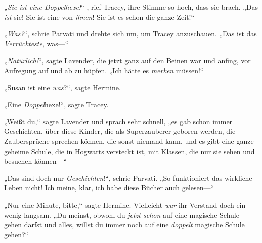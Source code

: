 „\emph{Sie ist eine Doppelhexe!}“ , rief Tracey, ihre Stimme so hoch, dass sie brach. „Das \emph{ist} sie! Sie ist eine von \emph{ihnen}! Sie ist es schon die ganze Zeit!“

„\emph{Was?}“, schrie Parvati und drehte sich um, um Tracey anzuschauen. „Das ist das \emph{Verrückteste}, was—“

„\emph{Natürlich!}“, sagte Lavender, die jetzt ganz auf den Beinen war und anfing, vor Aufregung auf und ab zu hüpfen. „Ich hätte es \emph{merken} müssen!“

„Susan ist eine \emph{was}?“, sagte Hermine.

„Eine \emph{Doppel}hexe!“, sagte Tracey.

„Weißt du,“ sagte Lavender und sprach sehr schnell, „es gab schon immer Geschichten, über diese Kinder, die als Superzauberer geboren werden, die Zaubersprüche sprechen können, die sonst niemand kann, und es gibt eine ganze geheime Schule, die in Hogwarts versteckt ist, mit Klassen, die nur sie sehen und besuchen können—“

„Das sind doch nur \emph{Geschichten}!“, schrie Parvati. „So funktioniert das wirkliche Leben nicht! Ich meine, klar, ich habe diese Bücher auch gelesen—“

„Nur eine Minute, bitte,“ sagte Hermine. Vielleicht \emph{war} ihr Verstand doch ein wenig langsam. „Du meinst, obwohl du \emph{jetzt schon} auf eine magische Schule gehen darfst und alles, willst du immer noch auf eine \emph{doppelt} magische Schule gehen?“

